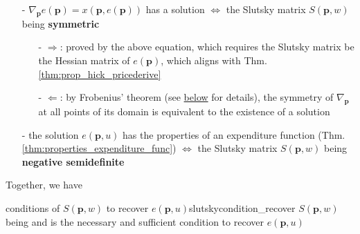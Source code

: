 \begin{enumerate}
    \item[-] $\nabla_{\mathbf{p}}e(\mathbf{p})=x(\mathbf{p},e(\mathbf{p}))$ has a solution $\Leftrightarrow$ the Slutsky matrix $S(\mathbf{p},w)$ being \textbf{symmetric}
    \begin{enumerate}
        \item[-] $\Rightarrow$: proved by the above equation, which requires the Slutsky matrix be the Hessian matrix of $e(\mathbf{p})$, which aligns with Thm.\ref{thm:prop_hick_pricederive}
        \item[-] $\Leftarrow$: by Frobenius' theorem (see \hyperref[sssec:frobenius_theorem]{below} for details), the symmetry of $\nabla_{\mathbf{p}}$ at all points of its domain is equivalent to the existence of a solution 
    \end{enumerate}
    \item[-] the solution $e(\mathbf{p},u)$ has the properties of an expenditure function (Thm.\ref{thm:properties_expenditure_func}) $\Leftrightarrow$ the Slutsky matrix $S(\mathbf{p},w)$ being \textbf{negative semidefinite}
\end{enumerate}

Together, we have
\begin{proposition}{conditions of $S(\mathbf{p},w)$ to recover $e(\mathbf{p},u)$}{slutskycondition_recover}
    $S(\mathbf{p},w)$ being  and  is the necessary and sufficient condition to recover $e(\mathbf{p},u)$
\end{proposition}

